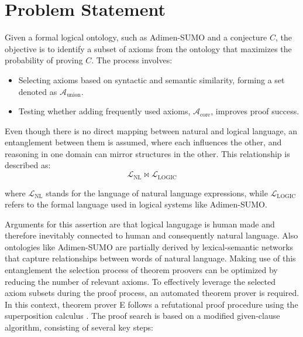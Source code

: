 \documentclass[english,version-2020-11]{uzl-thesis}
\begin{document}
\section{Problem Statement}
Given a formal logical ontology, such as Adimen-SUMO and a conjecture \( C \), the objective is to identify a subset of axioms from the ontology that maximizes the probability of proving \( C \). The process involves:
\begin{itemize}
    \item Selecting axioms based on syntactic and semantic similarity, forming a set denoted as \( \mathcal{A}_{\text{union}} \).
    \item Testing whether adding frequently used axioms, \( \mathcal{A}_{\text{core}} \), improves proof success.
\end{itemize}

Even though there is no direct mapping between natural and logical language, an entanglement between them is assumed, where each influences the other, and reasoning in one domain can mirror structures in the other. This relationship is described as:\\
\begin{equation}
    \mathcal{L}_{\text{NL}} \bowtie \mathcal{L}_{\text{LOGIC}}
\end{equation}

where \( \mathcal{L}_{\text{NL}} \) stands for the language of natural language expressions, while \( \mathcal{L}_{\text{LOGIC}} \) refers to the formal language used in logical systems like Adimen-SUMO.

Arguments for this assertion are that logical langugage is human made and therefore inevitably connected to human and consequently natural language.
Also ontologies like Adimen-SUMO are partially derived by lexical-semantic networks that capture relationships between words of natural language.
Making use of this entanglement the selection process of theorem proovers can be optimized by reducing the number of relevant axioms.
To effectively leverage the selected axiom subsets during the proof process, an automated theorem prover is required. In this context, theorem prover E follows a refutational proof procedure using the superposition calculus \cite{Schulz2019}. The proof search is based on a modified given-clause algorithm, consisting of several key steps:
\end{document}
